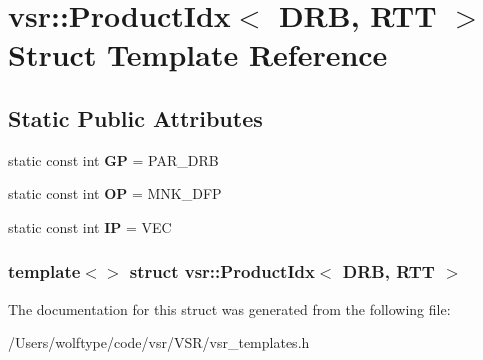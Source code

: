 \hypertarget{structvsr_1_1_product_idx_3_01_d_r_b_00_01_r_t_t_01_4}{\section{vsr\-:\-:Product\-Idx$<$ D\-R\-B, R\-T\-T $>$ Struct Template Reference}
\label{structvsr_1_1_product_idx_3_01_d_r_b_00_01_r_t_t_01_4}
}
\subsection*{Static Public Attributes}
\begin{DoxyCompactItemize}
\item 
\hypertarget{structvsr_1_1_product_idx_3_01_d_r_b_00_01_r_t_t_01_4_a9bc5720e7e4b8a8dd1227db53540c008}{static const int {\bfseries G\-P} = P\-A\-R\-\_\-\-D\-R\-B}\label{structvsr_1_1_product_idx_3_01_d_r_b_00_01_r_t_t_01_4_a9bc5720e7e4b8a8dd1227db53540c008}

\item 
\hypertarget{structvsr_1_1_product_idx_3_01_d_r_b_00_01_r_t_t_01_4_ab3953a44cccf4da353fb9c57689b304c}{static const int {\bfseries O\-P} = M\-N\-K\-\_\-\-D\-F\-P}\label{structvsr_1_1_product_idx_3_01_d_r_b_00_01_r_t_t_01_4_ab3953a44cccf4da353fb9c57689b304c}

\item 
\hypertarget{structvsr_1_1_product_idx_3_01_d_r_b_00_01_r_t_t_01_4_a227090894801adec19d0efcd1b3dbcfa}{static const int {\bfseries I\-P} = V\-E\-C}\label{structvsr_1_1_product_idx_3_01_d_r_b_00_01_r_t_t_01_4_a227090894801adec19d0efcd1b3dbcfa}

\end{DoxyCompactItemize}
\subsubsection*{template$<$$>$ struct vsr\-::\-Product\-Idx$<$ D\-R\-B, R\-T\-T $>$}



The documentation for this struct was generated from the following file\-:\begin{DoxyCompactItemize}
\item 
/\-Users/wolftype/code/vsr/\-V\-S\-R/vsr\-\_\-templates.\-h\end{DoxyCompactItemize}
